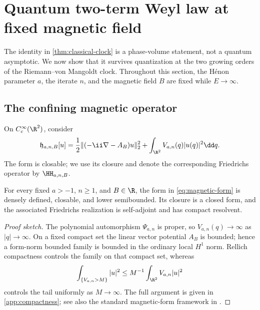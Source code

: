 \section{Quantum two-term Weyl law at fixed magnetic field}
\label{sec:quantum-weyl}

The identity in \cref{thm:classical-clock} is a phase-volume statement, not
a quantum asymptotic.  We now show that it survives quantization at the two
growing orders of the Riemann--von Mangoldt clock.  Throughout this section,
the H\'enon parameter \(a\), the iterate \(n\), and the magnetic field \(B\)
are fixed while \(E\to\infty\).

\subsection{The confining magnetic operator}

On \(C_c^\infty(\R^2)\), consider
\begin{equation}
 \mathfrak h_{a,n,B}[u]
 =\frac12\|(-\ii\nabla-A_B)u\|_2^2
  +\int_{\R^2}V_{a,n}(q)|u(q)|^2\dd q .
 \label{eq:magnetic-form}
\end{equation}
The form is closable; we use its closure and denote the corresponding
Friedrichs operator by
\(\HH_{a,n,B}\).

\begin{proposition}
\label{prop:compact-resolvent}
For every fixed \(a>-1\), \(n\geq1\), and \(B\in\R\), the form in
\cref{eq:magnetic-form} is densely defined, closable, and lower
semibounded.  Its closure is a closed form, and the associated Friedrichs
realization is self-adjoint and has compact resolvent.
\end{proposition}

\begin{proof}[Proof sketch]
The polynomial automorphism \(\Psi_{a,n}\) is proper, so
\(V_{a,n}(q)\to\infty\) as \(|q|\to\infty\).  On a fixed compact set the
linear vector potential \(A_B\) is bounded; hence a form-norm bounded family
is bounded in the ordinary local \(H^1\) norm.  Rellich compactness controls
the family on that compact set, whereas
\begin{equation}
 \int_{\{V_{a,n}>M\}}|u|^2
 \leq M^{-1}\int_{\R^2}V_{a,n}|u|^2
 \label{eq:potential-tail}
\end{equation}
controls the tail uniformly as \(M\to\infty\).  The full argument is given in
\cref{app:compactness}; see also the standard magnetic-form framework in
\citep{Kato1995,LeinfelderSimader1981,BravermanMilatovicShubin2002,MazyaShubin2005}.
\end{proof}

